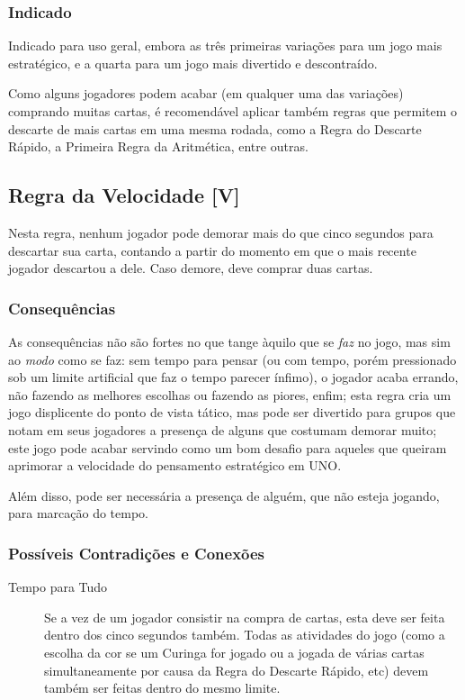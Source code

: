 \subsubsection{Indicado} 

Indicado para uso geral, embora as três primeiras variações para um jogo mais estratégico, e a quarta para um jogo mais divertido e descontraído.

Como alguns jogadores podem acabar (em qualquer uma das variações) comprando muitas cartas, é recomendável aplicar também regras que permitem o descarte de mais cartas em uma mesma rodada, como a Regra do Descarte Rápido, a Primeira Regra da Aritmética, entre outras.

\subsection{Regra da Velocidade [V]}

Nesta regra, nenhum jogador pode demorar mais do que cinco segundos para descartar sua carta, contando a partir do momento em que o mais recente jogador descartou a dele. Caso demore, deve comprar duas cartas.

\subsubsection{Consequências}

As consequências não são fortes no que tange àquilo que se \emph{faz} no jogo, mas sim ao \emph{modo} como se faz: sem tempo para pensar (ou com tempo, porém pressionado sob um limite artificial que faz o tempo parecer ínfimo), o jogador acaba errando, não fazendo as melhores escolhas ou fazendo as piores, enfim; esta regra cria um jogo displicente do ponto de vista tático, mas pode ser divertido para grupos que notam em seus jogadores a presença de alguns que costumam demorar muito; este jogo pode acabar servindo como um bom desafio para aqueles que queiram aprimorar a velocidade do pensamento estratégico em UNO.

Além disso, pode ser necessária a presença de alguém, que não esteja jogando, para marcação do tempo.

\subsubsection{Possíveis Contradições e Conexões}

\begin{description}
\item[Tempo para Tudo]{Se a vez de um jogador consistir na compra de cartas, esta deve ser feita dentro dos cinco segundos também. Todas as atividades do jogo (como a escolha da cor se um Curinga for jogado ou a jogada de várias cartas simultaneamente por causa da Regra do Descarte Rápido, etc) devem também ser feitas dentro do mesmo limite.}
\end{description}


